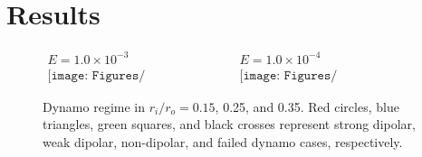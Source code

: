 \section{Results}




%
\begin{figure}
\begin{center}
\[
\begin{array}{cc}
\mbox{$E = 1.0 \times 10^{-3}$} &
\mbox{$E = 1.0 \times 10^{-4}$} \\
\texttt{[image: Figures/ratio\_rac\_VS\_aspect\_Ek3.pdf]} &
\texttt{[image: Figures/ratio\_rac\_VS\_aspect\_Ek4.pdf]}
\end{array}
\]
\end{center}
{\color{red}
\caption{
{\color{black}
Dynamo regime in $r_{i} / r_{o} = 0.15$, 0.25, and 0.35. Red circles, blue triangles, green squares, and black crosses represent strong dipolar, weak dipolar, non-dipolar, and failed dynamo cases, respectively.
}}
}
\label{fig:fig_12}
\end{figure}
